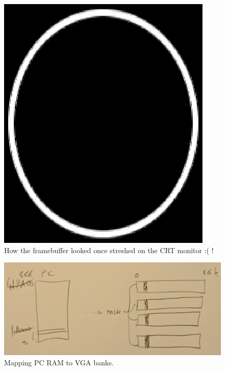 \documentclass[book.tex]{subfiles}
\begin{document}
\begin{itemize}
 \begin{figure}[H]
\centering
\includegraphics[width=\textwidth]{imgs/circlescreen.eps}
%
\caption{How the framebuffer looked once streshed on the CRT monitor :( !}
\end{figure}

 \begin{figure}[H]
\centering
  
      \includegraphics[width=\textwidth]{imgs/ram_to_vga_maping.png}
    
\caption{Mapping PC RAM to VGA banks.}
\end{figure}

\end{itemize}
\end{document}
